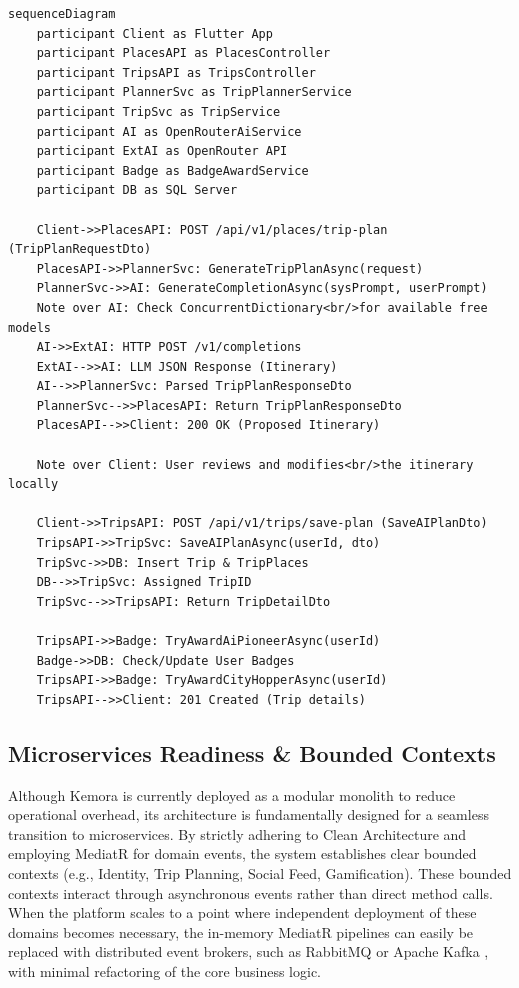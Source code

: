 \begin{verbatim}
sequenceDiagram
    participant Client as Flutter App
    participant PlacesAPI as PlacesController
    participant TripsAPI as TripsController
    participant PlannerSvc as TripPlannerService
    participant TripSvc as TripService
    participant AI as OpenRouterAiService
    participant ExtAI as OpenRouter API
    participant Badge as BadgeAwardService
    participant DB as SQL Server

    Client->>PlacesAPI: POST /api/v1/places/trip-plan (TripPlanRequestDto)
    PlacesAPI->>PlannerSvc: GenerateTripPlanAsync(request)
    PlannerSvc->>AI: GenerateCompletionAsync(sysPrompt, userPrompt)
    Note over AI: Check ConcurrentDictionary<br/>for available free models
    AI->>ExtAI: HTTP POST /v1/completions
    ExtAI-->>AI: LLM JSON Response (Itinerary)
    AI-->>PlannerSvc: Parsed TripPlanResponseDto
    PlannerSvc-->>PlacesAPI: Return TripPlanResponseDto
    PlacesAPI-->>Client: 200 OK (Proposed Itinerary)
    
    Note over Client: User reviews and modifies<br/>the itinerary locally
    
    Client->>TripsAPI: POST /api/v1/trips/save-plan (SaveAIPlanDto)
    TripsAPI->>TripSvc: SaveAIPlanAsync(userId, dto)
    TripSvc->>DB: Insert Trip & TripPlaces
    DB-->>TripSvc: Assigned TripID
    TripSvc-->>TripsAPI: Return TripDetailDto
    
    TripsAPI->>Badge: TryAwardAiPioneerAsync(userId)
    Badge->>DB: Check/Update User Badges
    TripsAPI->>Badge: TryAwardCityHopperAsync(userId)
    TripsAPI-->>Client: 201 Created (Trip details)
\end{verbatim}

\subsection{Microservices Readiness \& Bounded Contexts}
Although Kemora is currently deployed as a modular monolith to reduce operational overhead, its architecture is fundamentally designed for a seamless transition to microservices. By strictly adhering to Clean Architecture \cite{cleanarchitecture} and employing MediatR \cite{mediatr} for domain events, the system establishes clear bounded contexts (e.g., Identity, Trip Planning, Social Feed, Gamification). These bounded contexts interact through asynchronous events rather than direct method calls. When the platform scales to a point where independent deployment of these domains becomes necessary, the in-memory MediatR pipelines can easily be replaced with distributed event brokers, such as RabbitMQ \cite{rabbitmq} or Apache Kafka \cite{kafka}, with minimal refactoring of the core business logic.

